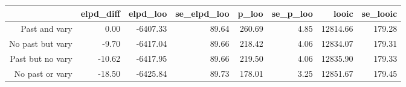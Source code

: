 \begin{table}[ht]
\centering
\begin{tabular}{rrrrrrrr}
  \hline
 & elpd\_diff & elpd\_loo & se\_elpd\_loo & p\_loo & se\_p\_loo & looic & se\_looic \\ 
  \hline
Past and vary & 0.00 & -6407.33 & 89.64 & 260.69 & 4.85 & 12814.66 & 179.28 \\ 
  No past but vary & -9.70 & -6417.04 & 89.66 & 218.42 & 4.06 & 12834.07 & 179.31 \\ 
  Past but no vary & -10.62 & -6417.95 & 89.66 & 219.50 & 4.06 & 12835.90 & 179.33 \\ 
  No past or vary & -18.50 & -6425.84 & 89.73 & 178.01 & 3.25 & 12851.67 & 179.45 \\ 
   \hline
\end{tabular}
\end{table}
